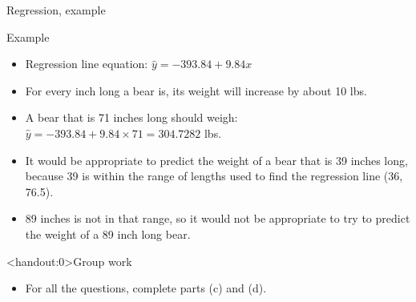 \documentclass[xcolor=table, handout]{beamer}
\begin{document}
\begin{frame}{Regression, example}
\begin{exampleblock}{Example}
\large
\begin{itemize}
\item Regression line equation: $\hat y = -393.84 + 9.84 x$
\pause\item For every inch long a bear is, its weight will increase by about 10 lbs.
\pause\item A bear that is 71 inches long should weigh:  $\hat y = -393.84 + 9.84 \times 71= 304.7282$ lbs.
\pause\item It would be appropriate to predict the weight of a bear that is 39 inches long, because 39 is within the range of lengths used to find the regression line (36, 76.5).
\pause\item 89 inches is not in that range, so it would not be appropriate to try to predict the weight of a 89 inch long bear.
\end{itemize}
\end{exampleblock}

\end{frame}

\begin{frame}<handout:0>{Group work}
\begin{block}{}
\large
\begin{itemize}
\item For all the questions, complete parts (c) and (d).
\end{itemize}
\end{block}
\end{frame}
\end{document}
